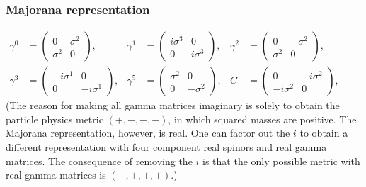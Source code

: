 \begin{frame}\frametitle{Majorana representation}
${\displaystyle {\begin{aligned}\gamma ^{0}&={\begin{pmatrix}0&\sigma ^{2}\\\sigma ^{2}&0\end{pmatrix}},&\gamma ^{1}&={\begin{pmatrix}i\sigma ^{3}&0\\0&i\sigma ^{3}\end{pmatrix}},&\gamma ^{2}&={\begin{pmatrix}0&-\sigma ^{2}\\\sigma ^{2}&0\end{pmatrix}},\\\gamma ^{3}&={\begin{pmatrix}-i\sigma ^{1}&0\\0&-i\sigma ^{1}\end{pmatrix}},&\gamma ^{5}&={\begin{pmatrix}\sigma ^{2}&0\\0&-\sigma ^{2}\end{pmatrix}},&C&={\begin{pmatrix}0&-i\sigma ^{2}\\-i\sigma ^{2}&0\end{pmatrix}},\end{aligned}}}$
\\

 (The reason for making all gamma matrices imaginary is solely to obtain the particle physics metric $(+, −, −, −)$, in which squared masses are positive. The Majorana representation, however, is real. One can factor out the $i$ to obtain a different representation with four component real spinors and real gamma matrices. The consequence of removing the $i$ is that the only possible metric with real gamma matrices is $(−, +, +, +)$.)

\end{frame}
